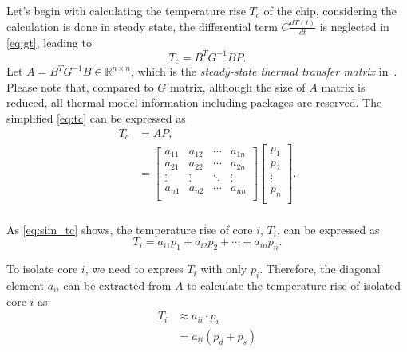 Let's begin with calculating the temperature rise $T_{c}$ of the chip, considering the calculation is done in steady state, the differential term $C\frac{dT(t)}{dt}$ is neglected in \eqref{eq:gt}, leading to
\begin{equation}\label{eq:tc}
T_{c} = B^{T}G^{-1}BP.
\end{equation}
Let $A = B^{T}G^{-1}B \in \mathbb{R}^{n \times n}$, which is the \emph{steady-state thermal transfer matrix} in~\cite{Reda:SJ'18}. Please note that, compared to $G$ matrix, although the size of $A$ matrix is reduced, all thermal model information including packages are reserved. The simplified 
\eqref{eq:tc} can be expressed as
\begin{equation}\label{eq:sim_tc}
\begin{split}
T_{c} &= AP,\\
&=
{\left[
\begin{matrix}
 a_{11} & a_{12} & \cdots & a_{1n} \\
 a_{21} & a_{22} & \cdots & a_{2n} \\
 \vdots & \vdots & \ddots & \vdots \\
 a_{n1} & a_{n2} & \cdots & a_{nn} \\
\end{matrix}
\right]}
{\left[
\begin{matrix}
 p_{1}   \\
 p_{2}   \\
 \vdots  \\
 p_{n}   \\
\end{matrix}
\right]}.\\
\end{split}
\end{equation}

As \eqref{eq:sim_tc} shows, the temperature rise of core $i$, $T_{i}$, can be expressed as
\begin{equation}\label{eq:ti}
T_{i} =a_{i1}p_{1} + a_{i2}p_{2} +\cdots + a_{in}p_{n}. 
\end{equation}


To isolate core $i$, we need to express $T_{i}$ with only $p_{i}$. Therefore, the diagonal element $a_{ii}$ can be extracted from $A$ to calculate the temperature rise of isolated core $i$ as:
\begin{equation}\label{eq:t_ap}
\begin{split}
T_{i}&\approx a_{ii} \cdot p_{i}\\
&=a_{ii}(p_{d}+p_{s})
\end{split}
\end{equation}

